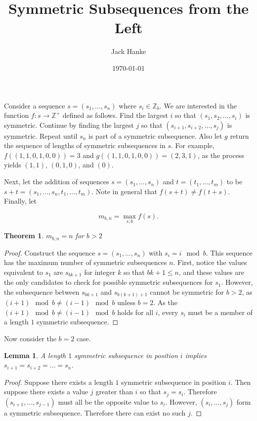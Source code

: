 \documentclass[12pt]{article}
\title{Symmetric Subsequences from the Left}
\author{Jack Hanke}
\date{\today}
\newtheorem{theorem}{Theorem}
\theoremstyle{plain}
\newtheorem{lemma}[thm]{Lemma}
\theoremstyle{definition}
\theoremstyle{remark}
\theoremstyle{definition}
\begin{document}
\maketitle

Consider a sequence $s = (s_1, \dots, s_n)$ where $s_i \in \mathbb{Z}_b$. We are interested in the function $f: s \to \mathbb{Z}^+$ defined as follows. Find the largest $i$ so that $(s_1, s_2, \dots, s_i)$ is symmetric. Continue by finding the largest $j$ so that $(s_{i+1}, s_{i+2}, \dots, s_{j})$ is symmetric. Repeat until $s_n$ is part of a symmetric subsequence. Also let $g$ return the sequence of lengths of symmetric subsequences in $s$. For example, $f((1,1,0,1,0,0)) = 3$ and $g((1,1,0,1,0,0)) = (2,3,1)$, as the process yields $(1,1)$, $(0,1,0)$, and $(0)$.

Next, let the addition of sequences $s = (s_1, \dots, s_n)$ and $t = (t_1, \dots, t_m)$ to be $s+t = (s_1,\dots,s_n,t_1,\dots,t_m)$. Note in general that $f(s+t) \neq f(t+s)$. Finally, let 

$$m_{b,n} = \max_{s,b} f(s).$$

\begin{theorem}
    $m_{b,n}=n$ for $b>2$
\end{theorem}

\begin{proof}
    Construct the sequence $s = (s_1, \dots, s_n)$ with $s_i = i \mod b$. This sequence has the maximum number of symmetric subsequences $n$. First, notice the values equivalent to $s_1$ are $s_{bk+1}$ for integer $k$ so that $bk+1 \leq n$, and these values are the only candidates to check for possible symmetric subsequences for $s_1$. However, the subsequence between $s_{bk+1}$ and $s_{b(k+1)+1}$ cannot be symmetric for $b>2$, as $(i+1) \mod b \neq (i-1) \mod b$ unless $b=2$. As the $(i+1) \mod b \neq (i-1) \mod b$ holds for all $i$, every $s_i$ must be a member of a length $1$ symmetric subsequence.
\end{proof}

Now consider the $b=2$ case.

\begin{lemma}\label{ones at end}
    A length $1$ symmetric subsequence in position $i$ implies $s_{i+1}=s_{i+2}=\dots=s_n$.
\end{lemma}

\begin{proof}
    Suppose there exists a length $1$ symmetric subsequence in position $i$. Then suppose there exists a value $j$ greater than $i$ so that $s_{j}=s_i$. Therefore $(s_{i+1},\dots,s_{j-1})$ must all be the opposite value to $s_i$. However, $(s_{i},\dots,s_{j})$ form a symmetric subsequence. Therefore there can exist no such $j$. 
\end{proof}
\end{document}
